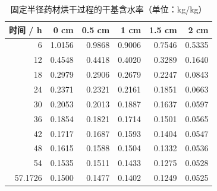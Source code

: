 \begin{table}[htbp]
\caption{固定半径药材烘干过程的干基含水率（单位：kg/kg）}\label{tab:required-5}
\centering
\small
\begin{tabular}{rrrrrr}
\toprule
时间 / h & 0 cm & 0.5 cm & 1 cm & 1.5 cm & 2 cm \\
\midrule
6 & 1.0156 & 0.9868 & 0.9006 & 0.7546 & 0.5335 \\
12 & 0.4548 & 0.4418 & 0.4020 & 0.3289 & 0.1640 \\
18 & 0.2979 & 0.2906 & 0.2679 & 0.2247 & 0.0843 \\
24 & 0.2371 & 0.2321 & 0.2161 & 0.1851 & 0.0663 \\
30 & 0.2053 & 0.2013 & 0.1887 & 0.1637 & 0.0597 \\
36 & 0.1854 & 0.1821 & 0.1714 & 0.1501 & 0.0565 \\
42 & 0.1717 & 0.1687 & 0.1593 & 0.1404 & 0.0547 \\
48 & 0.1615 & 0.1588 & 0.1504 & 0.1332 & 0.0536 \\
54 & 0.1535 & 0.1511 & 0.1433 & 0.1275 & 0.0528 \\
57.1726 & 0.1500 & 0.1477 & 0.1402 & 0.1249 & 0.0525 \\
\bottomrule
\end{tabular}
\end{table}
